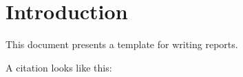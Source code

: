 \section{Introduction}\label{sec:introduction}

This document presents a template for writing reports.

A citation looks like this: \cite{10285163}
